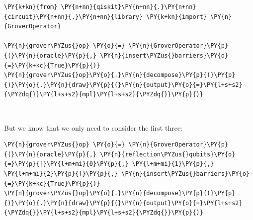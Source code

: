     \begin{tcolorbox}[breakable, size=fbox, boxrule=1pt, pad at break*=1mm,colback=cellbackground, colframe=cellborder]
\begin{Verbatim}[commandchars=\\\{\}]
\PY{k+kn}{from} \PY{n+nn}{qiskit}\PY{n+nn}{.}\PY{n+nn}{circuit}\PY{n+nn}{.}\PY{n+nn}{library} \PY{k+kn}{import} \PY{n}{GroverOperator}

\PY{n}{grover\PYZus{}op} \PY{o}{=} \PY{n}{GroverOperator}\PY{p}{(}\PY{n}{oracle}\PY{p}{,} \PY{n}{insert\PYZus{}barriers}\PY{o}{=}\PY{k+kc}{True}\PY{p}{)}
\PY{n}{grover\PYZus{}op}\PY{o}{.}\PY{n}{decompose}\PY{p}{(}\PY{p}{)}\PY{o}{.}\PY{n}{draw}\PY{p}{(}\PY{n}{output}\PY{o}{=}\PY{l+s+s2}{\PYZdq{}}\PY{l+s+s2}{mpl}\PY{l+s+s2}{\PYZdq{}}\PY{p}{)}
\end{Verbatim}
\end{tcolorbox}
 
            
    
    \begin{center}
    \end{center}
    { \hspace*{\fill} \\}
    

    But we know that we only need to consider the first three:

    \begin{tcolorbox}[breakable, size=fbox, boxrule=1pt, pad at break*=1mm,colback=cellbackground, colframe=cellborder]
\begin{Verbatim}[commandchars=\\\{\}]
\PY{n}{grover\PYZus{}op} \PY{o}{=} \PY{n}{GroverOperator}\PY{p}{(}\PY{n}{oracle}\PY{p}{,} \PY{n}{reflection\PYZus{}qubits}\PY{o}{=}\PY{p}{[}\PY{l+m+mi}{0}\PY{p}{,} \PY{l+m+mi}{1}\PY{p}{,} \PY{l+m+mi}{2}\PY{p}{]}\PY{p}{,} \PY{n}{insert\PYZus{}barriers}\PY{o}{=}\PY{k+kc}{True}\PY{p}{)}
\PY{n}{grover\PYZus{}op}\PY{o}{.}\PY{n}{decompose}\PY{p}{(}\PY{p}{)}\PY{o}{.}\PY{n}{draw}\PY{p}{(}\PY{n}{output}\PY{o}{=}\PY{l+s+s2}{\PYZdq{}}\PY{l+s+s2}{mpl}\PY{l+s+s2}{\PYZdq{}}\PY{p}{)}
\end{Verbatim}
\end{tcolorbox}
 
            
    
    \begin{center}
    \end{center}
    { \hspace*{\fill} \\}
    


